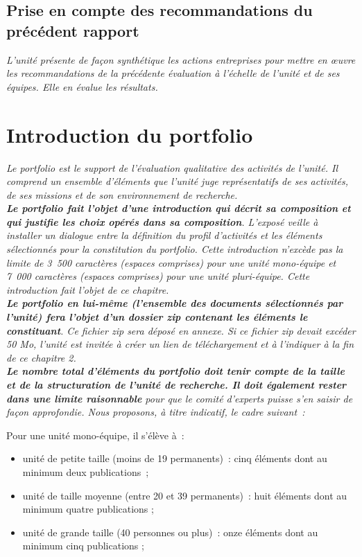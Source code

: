 \documentclass[]{article}
\newcommand{\instructions}[1]{{\em \color{hceresgreen}#1}}
\begin{document}
\subsection{Prise en compte des recommandations du précédent rapport}

\instructions{L’unité présente de façon synthétique les actions entreprises pour mettre en œuvre les recommandations de la précédente évaluation à l’échelle de l’unité et de ses équipes. Elle en évalue les résultats.}

\section{Introduction du portfolio}

\instructions{Le portfolio est le support de l’évaluation qualitative des activités de l’unité. Il comprend un ensemble d’éléments que l’unité juge représentatifs de ses activités, de ses missions et de son environnement de recherche.\\

{\bf Le portfolio fait l’objet d’une introduction qui décrit sa composition et qui justifie les choix opérés dans sa composition}. L’exposé veille à installer un dialogue entre la définition du profil d’activités et les éléments sélectionnés pour la constitution du portfolio. Cette introduction n’excède pas la limite de 3 500 caractères (espaces comprises) pour une unité mono-équipe et 7 000 caractères (espaces comprises) pour une unité pluri-équipe. Cette introduction fait l’objet de ce chapitre.\\

{\bf Le portfolio en lui-même (l’ensemble des documents sélectionnés par l’unité) fera l’objet d’un dossier zip contenant les éléments le constituant}. Ce fichier zip sera déposé en annexe. Si ce fichier zip devait excéder 50 Mo, l’unité est invitée à créer un lien de téléchargement et à l’indiquer à la fin de ce chapitre 2.\\

{\bf Le nombre total d’éléments du portfolio doit tenir compte de la taille et de la structuration de l’unité de recherche. Il doit également rester dans une limite raisonnable} pour que le comité d’experts puisse s’en saisir de façon approfondie. Nous proposons, à titre indicatif, le cadre suivant :

Pour une unité mono-équipe, il s’élève à :
\begin{itemize}
\item unité de petite taille (moins de 19 permanents) : cinq éléments dont au minimum deux publications ;
\item unité de taille moyenne (entre 20 et 39 permanents) : huit éléments dont au minimum quatre publications ;
\item unité de grande taille (40 personnes ou plus) : onze éléments dont au minimum cinq publications ;
\end{itemize}

}
\end{document}
